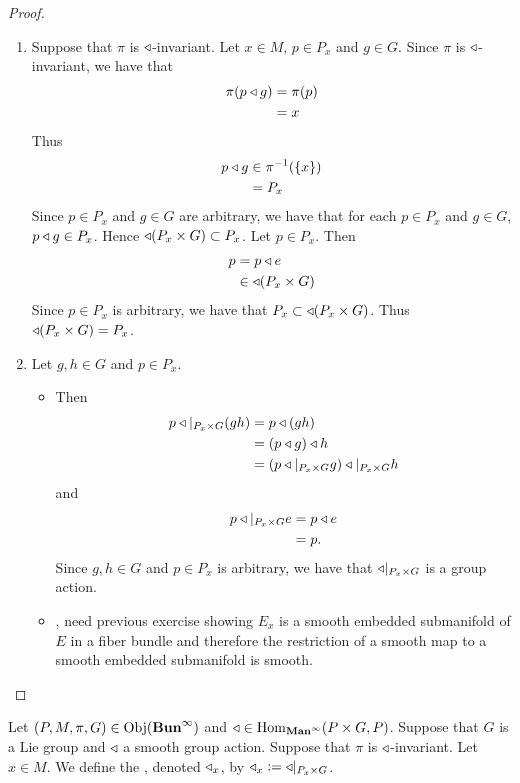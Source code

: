 \documentclass{book}
\begin{document}
	\begin{proof}\
		\begin{enumerate}
			\item Suppose that $\pi$ is $\triangleleft$-invariant. Let $x \in M$, $p \in P_x$ and $g \in G$. Since $\pi$ is $\triangleleft$-invariant, we have that  
			\begin{align*}
				\pi(p \triangleleft g)
				& = \pi(p) \\
				& = x
			\end{align*}
			Thus 
			\begin{align*}
				p \triangleleft g 
				& \in \pi^{-1}(\{x\}) \\
				& = P_x 
			\end{align*}
			Since $p \in P_x$ and $g \in G$ are arbitrary, we have that for each $p \in P_x$ and $g \in G$, $p \triangleleft g \in P_x$. Hence $\triangleleft(P_x \times G) \subset P_x$. Let $p \in P_x$. Then 
			\begin{align*}
				p
				& = p \triangleleft e \\
				& \in \triangleleft(P_x \times G)
			\end{align*}
			Since $p \in P_x$ is arbitrary, we have that $P_x \subset \triangleleft(P_x \times G)$. Thus $\triangleleft(P_x \times G) = P_x$.
			\item Let $g,h \in G$ and $p \in P_x$.
			\begin{itemize}
				\item Then
				\begin{align*}
					p \triangleleft|_{P_x \times G} (g h)
					& = p \triangleleft (gh) \\
					& = (p \triangleleft g) \triangleleft h \\
					& = (p \triangleleft|_{P_x \times G} g) \triangleleft|_{P_x \times G} h
				\end{align*}
				and 
				\begin{align*}
					p \triangleleft|_{P_x \times G} e
					& = p \triangleleft e \\
					& = p.
				\end{align*}
				Since $g,h \in G$ and $p \in P_x$ is arbitrary, we have that $\triangleleft|_{P_x \times G} $ is a group action.
				\item \tcr{FINISH!!!}, need previous exercise showing $E_x$ is a smooth embedded submanifold of $E$ in a fiber bundle and therefore the restriction of a smooth map to a smooth embedded submanifold is smooth.
			\end{itemize} 
		\end{enumerate}
	\end{proof}

	\begin{defn}
			Let $(P, M, \pi, G) \in \operatorname{Obj}(\operatorname*{\text{\textbf{Bun}}^{\infty}})$ and $\triangleleft \in \operatorname{Hom}_{\operatorname*{\text{\textbf{Man}}^{\infty}}}(P \times G, P)$. Suppose that $G$ is a Lie group and $\triangleleft$ a smooth group action. Suppose that $\pi$ is $\triangleleft$-invariant. Let $x \in M$. We define the , denoted $\triangleleft_x$, by $\triangleleft_x \vcentcolon= \triangleleft|_{P_x \times G}$. 
	\end{defn}
\end{document}
